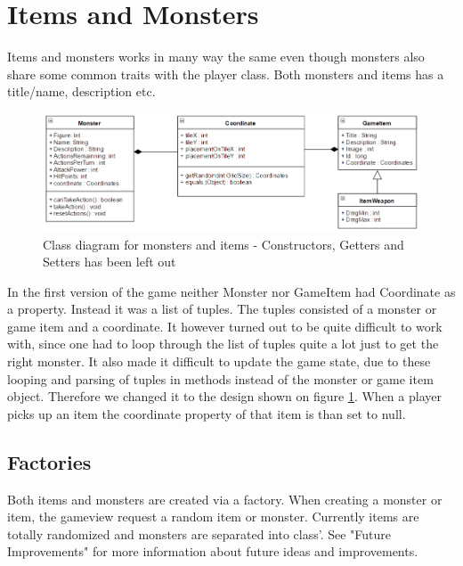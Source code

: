 \section{Items and Monsters}

Items and monsters works in many way the same even though monsters also share some common traits with the player class.
Both monsters and items has a title/name, description etc.

\begin{figure}[ht!]
	\centering
	\includegraphics[width=130mm]{images/itemsAndMonstersDiagram.png}
	\caption{Class diagram for monsters and items - Constructors, Getters and Setters has been left out}
	\label{fig:itemsAndMonstersDiagram}
\end{figure}

In the first version of the game neither Monster nor GameItem had Coordinate as a property. Instead it was a list of tuples. The tuples consisted of a monster or game item and a coordinate. It however turned out to be quite difficult to work with, since one had to loop through the list of tuples quite a lot just to get the right monster. It also made it difficult to update the game state, due to these looping and parsing of tuples in methods instead of the monster or game item object. Therefore we changed it to the design shown on figure \ref{fig:itemsAndMonstersDiagram}. When a player picks up an item the coordinate property of that item is than set to null. \\

\subsection{Factories}
Both items and monsters are created via a factory. When creating a monster or item, the gameview request a random item or monster. Currently items are totally randomized and monsters are separated into class'. See "Future Improvements" for more information about future ideas and improvements.
